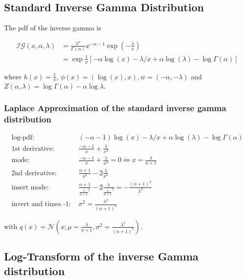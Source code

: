 \subsection{Standard Inverse Gamma Distribution}

The pdf of the inverse gamma is 

\begin{subequations}
\begin{align}
	\mathcal{IG}(x, \alpha, \lambda) &= \frac{\lambda^{\alpha}}{\Gamma(\alpha)} x^{-\alpha-1} \exp(-\frac{\lambda}{x}) \\
	&=\exp \frac{1}{x}\left[-\alpha\log(x) - \lambda/x + \alpha \log(\lambda) -\log\Gamma(\alpha)\right]
	\label{eq:pdf_inverse_gamma}
\end{align}
\end{subequations}

where $h(x) = \frac{1}{x}$, $\phi(x)=(\log(x), x), w= (-\alpha, -\lambda)$ and $Z(\alpha,\lambda) = \log\Gamma(\alpha) - \alpha\log\lambda$.

\subsubsection{Laplace Approximation of the standard inverse gamma distribution}

\begin{align*}
\text{log-pdf: } &(-\alpha-1)\log(x) - \lambda/x + \alpha \log(\lambda) -\log\Gamma(\alpha) \\
\text{1st derivative: }&  \frac{-\alpha-1}{x} + \frac{\lambda}{x^2}\\
\text{mode: }& \frac{-\alpha-1}{x} + \frac{\lambda}{x^2} = 0 \Leftrightarrow x = \frac{\lambda}{a+1}\\
\text{2nd derivative: }&  \frac{\alpha+1}{x^2} - 2\frac{\lambda}{x^3}\\
\text{insert mode: }& \frac{\alpha+1}{\frac{\lambda}{a+1}^2} - 2\frac{\lambda}{\frac{\lambda}{a+1}^3} = -\frac{(\alpha +1)^3}{\lambda^2} \\
\text{invert and times -1: }&\sigma^2 = \frac{\lambda^2}{(\alpha +1)^3}
\end{align*}

with $q(x) = \mathcal{N}(x; \mu = \frac{\lambda}{a+1}, \sigma^2 =\frac{\lambda^2}{(\alpha +1)^3} )$. 

\subsection{Log-Transform of the inverse Gamma distribution}

